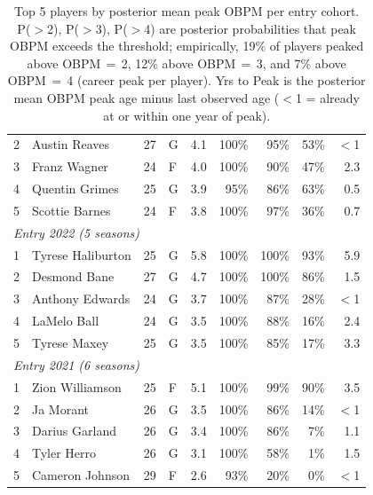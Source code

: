 \begin{table}[htbp]
\begin{tabular}{rlrlrrrrr}
    2 & Austin Reaves & 27 & G & 4.1 & 100\% & 95\% & 53\% & $<$1 \\
    3 & Franz Wagner & 24 & F & 4.0 & 100\% & 90\% & 47\% & 2.3 \\
    4 & Quentin Grimes & 25 & G & 3.9 & 95\% & 86\% & 63\% & 0.5 \\
    5 & Scottie Barnes & 24 & F & 3.8 & 100\% & 97\% & 36\% & 0.7 \\
    \midrule[0.4pt]
    \multicolumn{9}{l}{\textit{Entry 2022 (5 seasons)}} \\
    \midrule
    1 & Tyrese Haliburton & 25 & G & 5.8 & 100\% & 100\% & 93\% & 5.9 \\
    2 & Desmond Bane & 27 & G & 4.7 & 100\% & 100\% & 86\% & 1.5 \\
    3 & Anthony Edwards & 24 & G & 3.7 & 100\% & 87\% & 28\% & $<$1 \\
    4 & LaMelo Ball & 24 & G & 3.5 & 100\% & 88\% & 16\% & 2.4 \\
    5 & Tyrese Maxey & 25 & G & 3.5 & 100\% & 85\% & 17\% & 3.3 \\
    \midrule[0.4pt]
    \multicolumn{9}{l}{\textit{Entry 2021 (6 seasons)}} \\
    \midrule
    1 & Zion Williamson & 25 & F & 5.1 & 100\% & 99\% & 90\% & 3.5 \\
    2 & Ja Morant & 26 & G & 3.5 & 100\% & 86\% & 14\% & $<$1 \\
    3 & Darius Garland & 26 & G & 3.4 & 100\% & 86\% & 7\% & 1.1 \\
    4 & Tyler Herro & 26 & G & 3.1 & 100\% & 58\% & 1\% & 1.5 \\
    5 & Cameron Johnson & 29 & F & 2.6 & 93\% & 20\% & 0\% & $<$1 \\
    \bottomrule
  \end{tabular}
  \caption{Top 5 players by posterior mean peak OBPM per entry cohort. P($>$2), P($>$3), P($>$4) are posterior probabilities that peak OBPM exceeds the threshold; empirically, 19\% of players peaked above OBPM\,$=$\,2, 12\% above OBPM\,$=$\,3, and 7\% above OBPM\,$=$\,4 (career peak per player). Yrs to Peak is the posterior mean OBPM peak age minus last observed age ($<$1 = already at or within one year of peak).}
  \label{tab:breakout_cohort}
\end{table}

